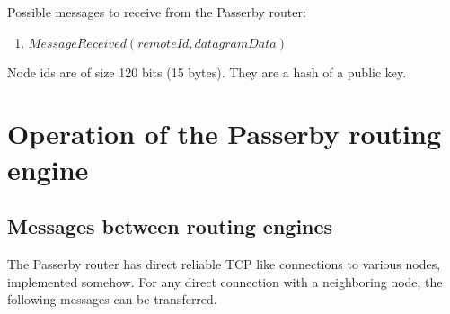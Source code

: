 \documentclass{amsart}
\theoremstyle{definition}
\theoremstyle{remark}
\numberwithin{equation}{section}
\begin{document}
Possible messages to receive from the Passerby router:
\begin{enumerate}
  \item $MessageReceived (remoteId, datagramData)$
\end{enumerate}

Node ids are of size 120 bits (15 bytes). They are a hash of a public key.

\section{Operation of the Passerby routing engine}

\subsection{Messages between routing engines}

The Passerby router has direct reliable TCP like connections to various nodes,
implemented somehow. For any direct connection with a neighboring node, the
following messages can be transferred.
\end{document}
